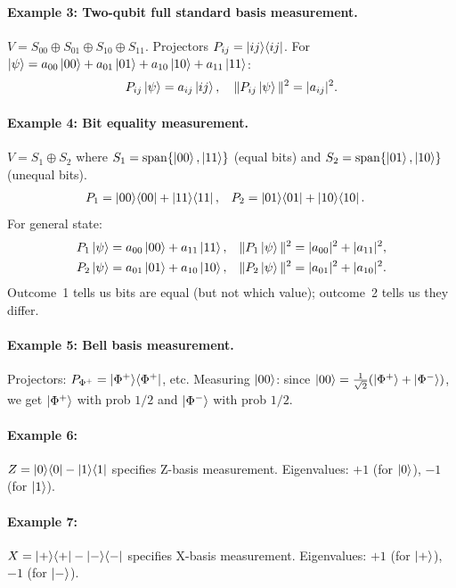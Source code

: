 \documentclass[10pt,a4paper]{article}
\begin{document}
\paragraph{Example 3: Two-qubit full standard basis measurement.}
$V=S_{00}\oplus S_{01}\oplus S_{10}\oplus S_{11}$. Projectors $P_{ij}=\ket{ij}\!\bra{ij}$. For $\ket{\psi}=a_{00}\ket{00}+a_{01}\ket{01}+a_{10}\ket{10}+a_{11}\ket{11}$:
\[
P_{ij}\ket{\psi}=a_{ij}\ket{ij},\quad \|P_{ij}\ket{\psi}\|^2=|a_{ij}|^2.
\]

\paragraph{Example 4: Bit equality measurement.}
$V=S_1\oplus S_2$ where $S_1=\mathrm{span}\{\ket{00},\ket{11}\}$ (equal bits) and $S_2=\mathrm{span}\{\ket{01},\ket{10}\}$ (unequal bits).
\begin{align*}
P_1 &= \ket{00}\!\bra{00}+\ket{11}\!\bra{11}, & P_2 &= \ket{01}\!\bra{01}+\ket{10}\!\bra{10}.
\end{align*}
For general state:
\begin{align*}
P_1\ket{\psi} &= a_{00}\ket{00}+a_{11}\ket{11}, & \|P_1\ket{\psi}\|^2 &= |a_{00}|^2+|a_{11}|^2,\\
P_2\ket{\psi} &= a_{01}\ket{01}+a_{10}\ket{10}, & \|P_2\ket{\psi}\|^2 &= |a_{01}|^2+|a_{10}|^2.
\end{align*}
Outcome~1 tells us bits are equal (but not which value); outcome~2 tells us they differ.

\paragraph{Example 5: Bell basis measurement.}
Projectors: $P_{\Phi^+}=\ket{\Phi^+}\!\bra{\Phi^+}$, etc. Measuring $\ket{00}$: since $\ket{00}=\frac{1}{\sqrt{2}}(\ket{\Phi^+}+\ket{\Phi^-})$, we get $\ket{\Phi^+}$ with prob $1/2$ and $\ket{\Phi^-}$ with prob $1/2$.

\paragraph{Example 6:} $Z=\ket{0}\!\bra{0}-\ket{1}\!\bra{1}$ specifies Z-basis measurement. Eigenvalues: $+1$ (for $\ket{0}$), $-1$ (for $\ket{1}$).

\paragraph{Example 7:} $X=\ket{+}\!\bra{+}-\ket{-}\!\bra{-}$ specifies X-basis measurement. Eigenvalues: $+1$ (for $\ket{+}$), $-1$ (for $\ket{-}$).
\end{document}

